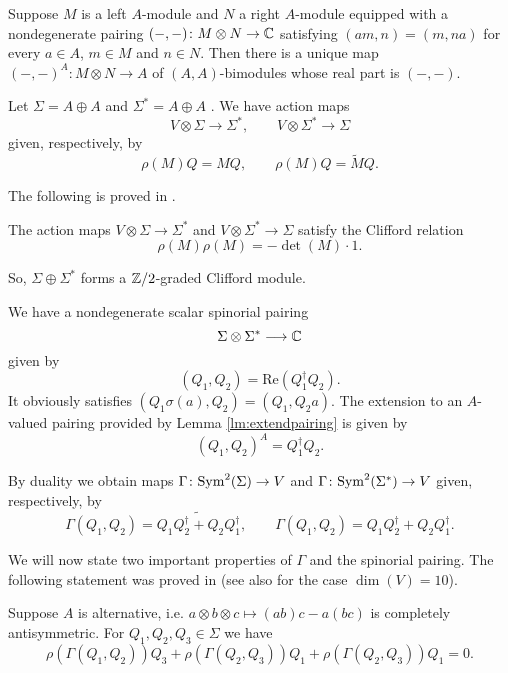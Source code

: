 \documentclass[10pt, oneside]{article}
\renewcommand{\Re}{\mathrm{Re}}
\begin{document}
\begin{lemma}
Suppose $M$ is a left $A$-module and $N$ a right $A$-module equipped with a nondegenerate pairing $(-, -)\colon M\otimes N\rightarrow \mathbb C$ satisfying $(am, n) = (m, na)$ for every $a\in A$, $m\in M$ and $n\in N$. Then there is a unique map $(-, -)^A\colon M\otimes N\rightarrow A$ of $(A, A)$-bimodules whose real part is $(-, -)$.
\label{lm:extendpairing}
\end{lemma}

Let $\Sigma=A\oplus A$ and $\Sigma^* = A\oplus A$ . We have action maps
\[V\otimes \Sigma\rightarrow \Sigma^*,\qquad V\otimes \Sigma^*\rightarrow \Sigma\]
given, respectively, by
\[\rho(M)Q = M Q,\qquad \rho(M)Q = \widetilde{M} Q.\]

The following is proved in \cite[Proposition 6]{BaezHuerta}.

\begin{prop}
The action maps $V\otimes \Sigma\rightarrow \Sigma^*$ and $V\otimes \Sigma^*\rightarrow \Sigma$ satisfy the Clifford relation
\[\rho(M)\rho(M) = -\det(M)\cdot 1.\]
\end{prop}

So, $\Sigma\oplus \Sigma^*$ forms a $\mathbb Z/2$-graded Clifford module.

We have a nondegenerate scalar spinorial pairing
\[\Sigma\otimes \Sigma^*\longrightarrow \mathbb C\]
given by
\[(Q_1, Q_2) = \Re(Q_1^\dagger Q_2).\]
It obviously satisfies $(Q_1 \sigma(a), Q_2) = (Q_1, Q_2 a)$. The extension to an $A$-valued pairing provided by Lemma \ref{lm:extendpairing} is given by
\[(Q_1, Q_2)^A = Q_1^\dagger Q_2.\]

By duality we obtain maps $\Gamma\colon{\rm Sym}^2(\Sigma)\rightarrow V$ and $\Gamma\colon {\rm Sym}^2(\Sigma^*)\rightarrow V$ given, respectively, by
\[\Gamma(Q_1, Q_2) = \widetilde{Q_1Q_2^\dagger + Q_2Q_1^\dagger},\qquad \Gamma(Q_1, Q_2) = Q_1Q_2^\dagger + Q_2Q_1^\dagger.\]

We will now state two important properties of $\Gamma$ and the spinorial pairing. The following statement was proved in \cite[Theorem 11]{BaezHuerta} (see also \cite{Schray} for the case $\dim(V)=10$).

\begin{thm}
Suppose $A$ is alternative, i.e. $a\otimes b\otimes c\mapsto (ab)c - a(bc)$ is completely antisymmetric. For $Q_1, Q_2, Q_3\in\Sigma$ we have
\[\rho(\Gamma(Q_1, Q_2))Q_3 + \rho(\Gamma(Q_2, Q_3))Q_1 + \rho(\Gamma(Q_2, Q_3))Q_1 = 0.\]
\label{thm:3psi}
\end{thm}
\end{document}
